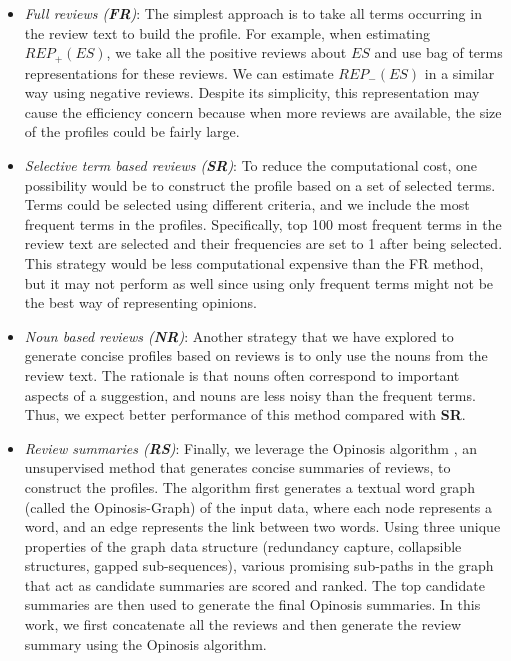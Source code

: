 \begin{itemize}

\item \textit{Full reviews (\textbf{FR})}: 
The simplest approach is to take all terms 
occurring in the review text to build the profile. 
For example, when estimating $REP_{+}(ES)$, 
we take all the positive reviews about $ES$ 
and use bag of terms representations for 
these reviews.  We can estimate $REP_{-}(ES)$
in a similar way using negative reviews. 
Despite its simplicity, this representation 
may cause the efficiency concern because 
when more reviews are available, the size 
of the profiles could be fairly large. 
 
\item \textit{Selective term based reviews (\textbf{SR})}:
To reduce the computational cost, one possibility 
would be to construct the profile based on 
a set of selected terms. Terms could be selected
using different criteria, and we include the 
most frequent terms in the profiles. Specifically, 
top 100 most frequent terms in the review text are selected 
and their frequencies are set to 1 after being selected.
This strategy would be less computational 
expensive than the FR method, but it may
not perform as well since using only frequent 
terms might not be the best way of representing 
opinions. 

\item \textit{Noun based reviews (\textbf{NR})}:
Another strategy that we have explored to generate 
concise profiles based on reviews is to only use 
the nouns from the review text.  The rationale is that 
nouns often correspond to important aspects of 
a suggestion, and nouns are less noisy than 
the frequent terms. Thus, we expect better 
performance of this method compared with \textbf{SR}. 

\item \textit{Review summaries (\textbf{RS})}:
Finally, we leverage the Opinosis algorithm 
\cite{Ganesan:2010:OGA:1873781.1873820}, 
an unsupervised method that generates concise summaries of reviews, 
to construct the profiles. The algorithm 
first generates a textual word graph (called the Opinosis-Graph) of the input data, 
where each node represents a word, and an edge represents the 
link between two words. Using three unique properties of the 
graph data structure (redundancy capture, collapsible 
structures, gapped sub-sequences), various promising 
sub-paths in the graph that act as candidate summaries are 
scored and ranked. The top candidate summaries are then 
used to generate the final Opinosis summaries. 
In this work, we first concatenate all the reviews and 
then generate the review summary using the Opinosis algorithm. 

\end{itemize}

